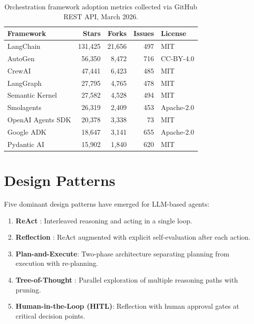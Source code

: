 \documentclass[sn-basic]{sn-jnl}
\theoremstyle{definition}
\begin{document}
\begin{table}[ht]
\centering
\caption{Orchestration framework adoption metrics collected via GitHub REST API, March 2026.}
\label{tab:frameworks}
\begin{tabular}{lrrrl}
\toprule
\textbf{Framework} & \textbf{Stars} & \textbf{Forks} & \textbf{Issues} & \textbf{License} \\
\midrule
LangChain        & 131,425 & 21,656 & 497  & MIT \\
AutoGen          & 56,350  & 8,472  & 716  & CC-BY-4.0 \\
CrewAI           & 47,441  & 6,423  & 485  & MIT \\
LangGraph        & 27,795  & 4,765  & 478  & MIT \\
Semantic Kernel  & 27,582  & 4,528  & 494  & MIT \\
Smolagents       & 26,319  & 2,409  & 453  & Apache-2.0 \\
OpenAI Agents SDK& 20,378  & 3,338  & 73   & MIT \\
Google ADK       & 18,647  & 3,141  & 655  & Apache-2.0 \\
Pydantic AI      & 15,902  & 1,840  & 620  & MIT \\
\bottomrule
\end{tabular}
\end{table}

\section{Design Patterns}\label{sec:patterns}

Five dominant design patterns have emerged for LLM-based agents:

\begin{enumerate}
    \item \textbf{ReAct} \citep{yao2023react}: Interleaved reasoning and acting in a single loop.
    \item \textbf{Reflection} \citep{shinn2023reflexion}: ReAct augmented with explicit self-evaluation after each action.
    \item \textbf{Plan-and-Execute}: Two-phase architecture separating planning from execution with re-planning.
    \item \textbf{Tree-of-Thought} \citep{yao2024tree}: Parallel exploration of multiple reasoning paths with pruning.
    \item \textbf{Human-in-the-Loop (HITL)}: Reflection with human approval gates at critical decision points.
\end{enumerate}
\end{document}
